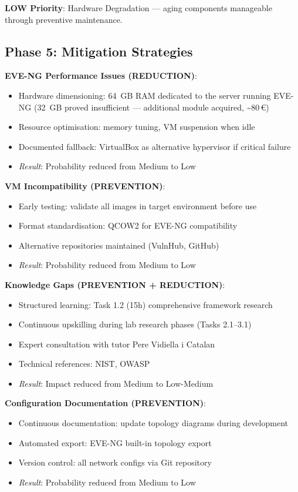 \textbf{LOW Priority}: Hardware Degradation --- aging components manageable through
preventive maintenance.

\subsection{Phase 5: Mitigation Strategies}

\textbf{EVE-NG Performance Issues (REDUCTION)}:
\begin{itemize}
\item Hardware dimensioning: 64~GB RAM dedicated to the server running EVE-NG
      (32~GB proved insufficient --- additional module acquired, \textasciitilde{}80\,\euro)
\item Resource optimisation: memory tuning, VM suspension when idle
\item Documented fallback: VirtualBox as alternative hypervisor if critical failure
\item \textit{Result}: Probability reduced from Medium to Low
\end{itemize}

\textbf{VM Incompatibility (PREVENTION)}:
\begin{itemize}
\item Early testing: validate all images in target environment before use
\item Format standardisation: QCOW2 for EVE-NG compatibility
\item Alternative repositories maintained (VulnHub, GitHub)
\item \textit{Result}: Probability reduced from Medium to Low
\end{itemize}

\textbf{Knowledge Gaps (PREVENTION + REDUCTION)}:
\begin{itemize}
\item Structured learning: Task 1.2 (15h) comprehensive framework research
\item Continuous upskilling during lab research phases (Tasks 2.1--3.1)
\item Expert consultation with tutor Pere Vidiella i Catalan
\item Technical references: NIST\cite{nist_sp800115}, OWASP\cite{owasp_testing_guide}
\item \textit{Result}: Impact reduced from Medium to Low-Medium
\end{itemize}

\textbf{Configuration Documentation (PREVENTION)}:
\begin{itemize}
\item Continuous documentation: update topology diagrams during development
\item Automated export: EVE-NG built-in topology export
\item Version control: all network configs via Git repository
\item \textit{Result}: Probability reduced from Medium to Low
\end{itemize}

